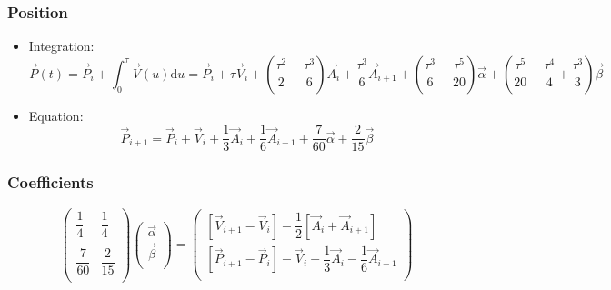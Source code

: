 \documentclass[aps,12pt]{revtex4}
\begin{document}
\subsubsection{Position}
\begin{itemize}
\item Integration:
\begin{equation}
	\vec{P}(t) = \vec{P}_{i} + \int_0^\tau \vec{V}(u)\mathrm{d}u = \vec{P}_i + \tau \vec{V}_i 
	+ \left(\dfrac{\tau^2}{2} - \dfrac{\tau^3}{6}\right) \vec{A}_i + \dfrac{\tau^3}{6} \vec{A}_{i+1} 
	+ \left(\dfrac{\tau^3}{6} - \dfrac{\tau^5}{20} \right) \vec{\alpha}
	+ \left( \dfrac{\tau^5}{20} - \dfrac{\tau^4}{4} + \dfrac{\tau^3}{3} \right) \vec{\beta}
\end{equation}

\item Equation:
\begin{equation}
	\vec{P}_{i+1} = \vec{P}_i + \vec{V}_{i} + \dfrac{1}{3} \vec{A}_i + \dfrac{1}{6} \vec{A}_{i+1} + \dfrac{7}{60} \vec{\alpha} + \dfrac{2}{15} \vec{\beta}
\end{equation}

\end{itemize}

\subsubsection{Coefficients}

\begin{equation}
\begin{pmatrix}
\dfrac{1}{4} & \dfrac{1}{4} \\
\\
\dfrac{7}{60} & \dfrac{2}{15}\\
\end{pmatrix}
\begin{pmatrix}
\vec{\alpha}\\
\vec{\beta}\\
\end{pmatrix}
=
\begin{pmatrix}
\left[\vec{V}_{i+1}-\vec{V}_{i}\right] - \dfrac{1}{2}\left[\vec{A}_i + \vec{A}_{i+1}\right]\\
\left[\vec{P}_{i+1}-\vec{P}_{i}\right] - \vec{V}_i - \dfrac{1}{3} \vec{A}_i - \dfrac{1}{6} \vec{A}_{i+1}\\
\end{pmatrix}
\end{equation}
\end{document}
